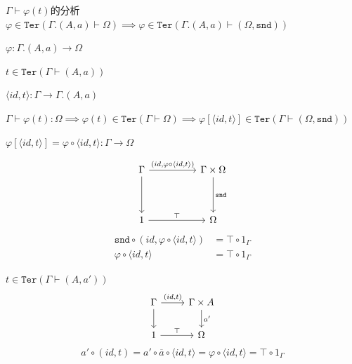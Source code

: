 \documentclass[aspectratio=169,xcolor=dvipsnames]{beamer}
\newcommand\snd{\mathtt{snd}}
\newcommand\Ter{\mathtt{Ter}}
\begin{document}
\begin{frame}{$\Gamma\vdash\varphi(t)$的分析}
  $\varphi \in \Ter(\Gamma.(A,a)\vdash\Omega) \implies \varphi \in \Ter(\Gamma.(A,a)\vdash(\Omega,\snd))$

  $\varphi : \Gamma.(A,a) \to \Omega$

  $t\in\Ter(\Gamma\vdash(A,a))$

  $\langle id,t\rangle : \Gamma \to \Gamma.(A,a)$

  $\Gamma\vdash\varphi(t):\Omega \implies \varphi(t) \in \Ter(\Gamma\vdash\Omega)\implies \varphi[\langle id,t\rangle] \in \Ter(\Gamma\vdash(\Omega,\snd))$

  $\varphi[\langle id,t\rangle] = \varphi \circ \langle id,t\rangle : \Gamma \to \Omega$

  \[
  \begin{tikzcd}[column sep=huge,row sep=huge]
    \Gamma \arrow[d] \arrow[r,"{(id,\varphi \circ \langle id,t\rangle)}"] & \Gamma\times\Omega \arrow[d,"\snd"] \\
    1 \arrow[r,"\top"] & \Omega
  \end{tikzcd}
  \]
  \begin{align*}
  \snd\circ(id,\varphi \circ \langle id,t\rangle) &= \top\circ1_{\Gamma} \\
  \varphi\circ\langle id,t\rangle &= \top\circ1_{\Gamma}
\end{align*}
\end{frame}

\begin{frame}{$t\in\Ter(\Gamma\vdash(A,a'))$}
  \[
  \begin{tikzcd}
    \Gamma \arrow[d] \arrow[r,"{(id,t)}"] & \Gamma\times A \arrow[d,"a'"] \\
    1 \arrow[r,"\top"] & \Omega
  \end{tikzcd}
  \]
  \[
  a'\circ(id,t)=a'\circ\overline{a}\circ\langle id,t\rangle=\varphi\circ\langle id,t\rangle=\top\circ1_{\Gamma}
  \]
\end{frame}
\end{document}
